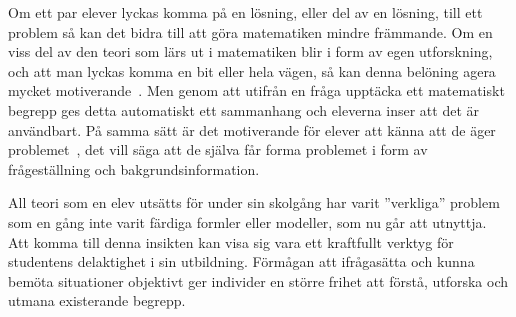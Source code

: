 
\label{sec:delaktighet}
\textcolor{WildStrawberry}{
    Om ett par elever lyckas komma på en lösning, eller del av en lösning, till ett problem så kan det bidra till att göra matematiken mindre främmande. Om en viss del av den teori som lärs ut i matematiken blir i form av egen utforskning, och att man lyckas komma en bit eller hela vägen, så kan denna belöning agera mycket motiverande~\cite{TheElephant}.} \textcolor{lila}{Men genom att utifrån en fråga upptäcka ett matematiskt begrepp ges detta automatiskt ett sammanhang och eleverna inser att det är användbart. På samma sätt är det motiverande för elever att känna att de äger problemet~\cite{TheElephant}, det vill säga att de själva får forma problemet i form av frågeställning och bakgrundsinformation. }
    
\textcolor{WildStrawberry}{
    All teori som en elev utsätts för under sin skolgång har varit ''verkliga'' problem som en gång inte varit färdiga formler eller modeller, som nu går att utnyttja. Att komma till denna insikten kan visa sig vara ett kraftfullt verktyg för studentens delaktighet i sin utbildning. Förmågan att ifrågasätta och kunna bemöta situationer objektivt ger individer en större frihet att förstå, utforska och utmana existerande begrepp. }
        
